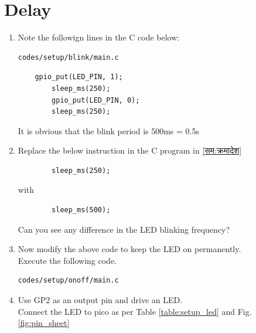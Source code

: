 \documentclass[journal,12pt,twocolumn]{IEEEtran}
\renewcommand\thesection{\arabic{section}}
\begin{document}
\section{Delay}

\renewcommand{\theequation}{\theenumi}
\renewcommand{\thefigure}{\theenumi}
\begin{enumerate}[label=\thesection.\arabic*.,ref=\thesection.\theenumi]
\item Note the followign lines in the C code below:
\label{सम:क्रमादेश}
\begin{lstlisting}
codes/setup/blink/main.c
\end{lstlisting}
%
\begin{lstlisting}
	gpio_put(LED_PIN, 1);
        sleep_ms(250);
        gpio_put(LED_PIN, 0);
        sleep_ms(250);
\end{lstlisting}
%
It is obvious that the blink period is 500ms = 0.5s
\item Replace the below instruction in the C program in \ref{सम:क्रमादेश} 
\label{सम:द्विआधार}
\begin{lstlisting}
        sleep_ms(250);
\end{lstlisting}
%
with
\begin{lstlisting}
        sleep_ms(500);
\end{lstlisting}
Can you see any difference in the LED blinking frequency?

\item Now modify the above code to keep the LED on permanently.
\\
\solution Execute the following code.
\begin{lstlisting}
codes/setup/onoff/main.c
\end{lstlisting}
\item Use GP2 as an output pin and drive an LED.
\\
\solution  Connect the LED to pico as per Table \ref{table:setup_led} and Fig. \ref{fig:pin_sheet}


\end{enumerate}
\end{document}
